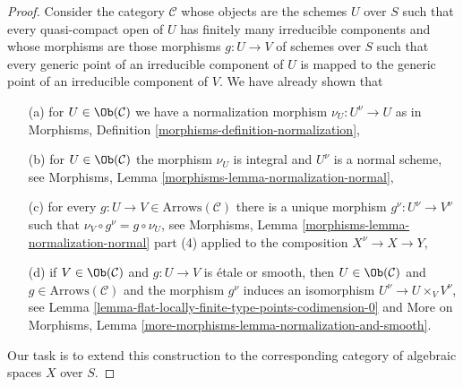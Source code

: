 \begin{proof}
Consider the category $\mathcal{C}$ whose objects are the
schemes $U$ over $S$ such that every quasi-compact open of
$U$ has finitely many irreducible components and whose morphisms
are those morphisms $g : U \to V$ of schemes over $S$ such
that every generic point of an irreducible component of $U$
is mapped to the generic point of an irreducible component of $V$.
We have already shown that
\begin{enumerate}
\item[(a)] for $U \in \Ob(\mathcal{C})$ we have a
normalization morphism $\nu_U : U^\nu \to U$ as in
Morphisms, Definition \ref{morphisms-definition-normalization},
\item[(b)] for $U \in \Ob(\mathcal{C})$ the morphism $\nu_U$
is integral and $U^\nu$ is a normal scheme, see
Morphisms, Lemma \ref{morphisms-lemma-normalization-normal},
\item[(c)] for every $g : U \to V \in \text{Arrows}(\mathcal{C})$
there is a unique morphism $g^\nu : U^\nu \to V^\nu$
such that $\nu_V \circ g^\nu = g \circ \nu_U$, see
Morphisms, Lemma \ref{morphisms-lemma-normalization-normal}
part (4) applied to the composition $X^\nu \to X \to Y$,
\item[(d)] if $V \in \Ob(\mathcal{C})$ and $g : U \to V$ is
\'etale or smooth, then $U \in \Ob(\mathcal{C})$ and
$g \in \text{Arrows}(\mathcal{C})$ and the morphism $g^\nu$
induces an isomorphism $U^\nu \to U \times_V V^\nu$, see
Lemma \ref{lemma-flat-locally-finite-type-points-codimension-0}
and More on Morphisms, Lemma
\ref{more-morphisms-lemma-normalization-and-smooth}.
\end{enumerate}
Our task is to extend this construction to the corresponding
category of algebraic spaces $X$ over $S$.


\end{proof}
